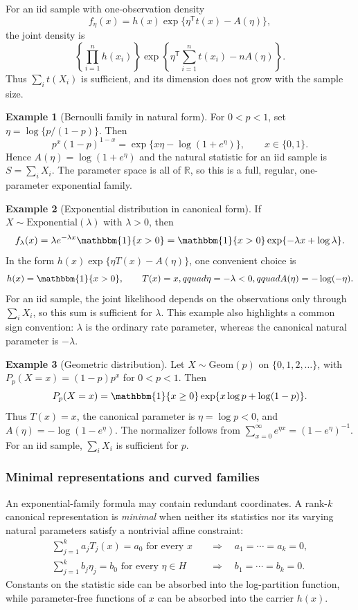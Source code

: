 \documentclass[12pt,oneside]{book}
\numberwithin{equation}{section}
\theoremstyle{definition}
\newtheorem{example}{Example}[section]
\theoremstyle{plain}
\theoremstyle{remark}
\newcommand{\R}{\mathbb{R}}
\newcommand{\ind}{\mathbbm{1}}
\newcommand{\Exp}{\mathrm{Exponential}}
\begin{document}
For an iid sample with one-observation density
\[
    f_\eta(x)=h(x)\exp\{\eta^\mathsf{T}t(x)-A(\eta)\},
\]
the joint density is
\[
    \left\{\prod_{i=1}^nh(x_i)\right\}
    \exp\left\{\eta^\mathsf{T}\sum_{i=1}^nt(x_i)-nA(\eta)\right\}.
\]
Thus $\sum_i t(X_i)$ is sufficient, and its dimension does not grow with the
sample size.

\begin{example}[Bernoulli family in natural form]
For $0<p<1$, set $\eta=\log\{p/(1-p)\}$.  Then
\[
    p^x(1-p)^{1-x}
    =\exp\{x\eta-\log(1+e^\eta)\},\qquad x\in\{0,1\}.
\]
Hence $A(\eta)=\log(1+e^\eta)$ and the natural statistic for an iid sample is
$S=\sum_iX_i$.  The parameter space is all of $\R$, so this is a full,
regular, one-parameter exponential family.
\end{example}

\begin{example}[Exponential distribution in canonical form]
If $X\sim\Exp(\lambda)$ with $\lambda>0$, then
\[
 f_\lambda(x)=\lambda e^{-\lambda x}\ind\{x>0\}
 =\ind\{x>0\}\exp\{-\lambda x+\log\lambda\}.
\]
In the form $h(x)\exp\{\eta T(x)-A(\eta)\}$, one convenient choice is
\[
 h(x)=\ind\{x>0\},\qquad T(x)=x,qquad
 \eta=-\lambda<0,qquad A(\eta)=-\log(-\eta).
\]
For an iid sample, the joint likelihood depends on the observations only
through $\sum_iX_i$, so this sum is sufficient for $\lambda$. This example
also highlights a common sign convention: $\lambda$ is the ordinary rate
parameter, whereas the canonical natural parameter is $-\lambda$.
\end{example}

\begin{example}[Geometric distribution]
Let $X\sim\mathrm{Geom}(p)$ on $\{0,1,2,\ldots\}$, with
$P_p(X=x)=(1-p)p^x$ for $0<p<1$. Then
\[
 P_p(X=x)=\ind\{x\geq0\}\exp\{x\log p+\log(1-p)\}.
\]
Thus $T(x)=x$, the canonical parameter is $\eta=\log p<0$, and
$A(\eta)=-\log(1-e^\eta)$. The normalizer follows from
$\sum_{x=0}^\infty e^{\eta x}=(1-e^\eta)^{-1}$. For an iid sample,
$\sum_iX_i$ is sufficient for $p$.
\end{example}

\subsubsection{Minimal representations and curved families}

An exponential-family formula may contain redundant coordinates. A
rank-$k$ canonical representation is \emph{minimal} when neither its
statistics nor its varying natural parameters satisfy a nontrivial affine
constraint:
\begin{align*}
 \sum_{j=1}^k a_jT_j(x)=a_0\text{ for every }x
 &\quad\Longrightarrow\quad a_1=\cdots=a_k=0,\\
 \sum_{j=1}^k b_j\eta_j=b_0\text{ for every }\eta\in H
 &\quad\Longrightarrow\quad b_1=\cdots=b_k=0.
\end{align*}
Constants on the statistic side can be absorbed into the log-partition
function, while parameter-free functions of $x$ can be absorbed into the
carrier $h(x)$.
\end{document}

